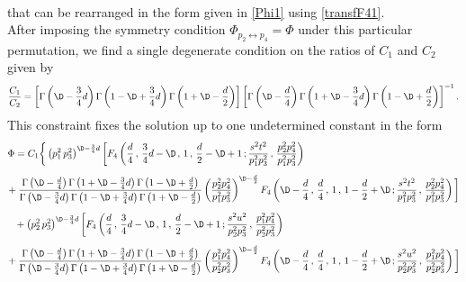 \documentclass[a4paper,11pt,openright,twoside]{book}
\numberwithin{equation}{section}
\begin{document}
{\begin{align}
\end{align}
that can be rearranged in the form given in \eqref{Phi1} using \eqref{transfF41}.\\
After imposing the symmetry condition $\Phi_{p_2\leftrightarrow p_4}=\Phi$ under this particular permutation, we find a single degenerate condition on the ratios of $C_1$ and $C_2$ given by
\begin{equation}
	\frac{C_1}{C_2}=\left[\Gamma\left(\D-\frac{3}{4}d\right)\Gamma\left(1-\D+\frac{3}{4}d\right)\Gamma\left(1+\D-\frac{d}{2}\right)\right]\left[\Gamma\left(\D-\frac{d}{4}\right)\Gamma\left(1+\D-\frac{3}{4}d\right)\Gamma\left(1-\D+\frac{d}{2}\right)\right]^{-1}.
\end{equation}
This constraint fixes the solution up to one undetermined constant in the form
\begin{equation*}
	\begin{aligned}
		\Phi&=C_1\bigg\{\left(p_1^2\,p_3^2\right)^{\D-\frac{3}{4}d}\bigg[F_4\left(\frac{d}{4}\,,\,\frac{3}{4}d-\D\,,\,1\,,\,\frac{d}{2}-\D+1\,;\frac{s^2t^2}{p_1^2p_3^2}\,,\,\frac{p_2^2p_4^2}{p_1^2p_3^2}\right)\\[1.2ex]
		&\hspace{-0.3cm}+\frac{\Gamma\left(\D-\frac{d}{4}\right)\Gamma\left(1+\D-\frac{3}{4}d\right)\Gamma\left(1-\D+\frac{d}{2}\right)}{\Gamma\left(\D-\frac{3}{4}d\right)\Gamma\left(1-\D+\frac{3}{4}d\right)\Gamma\left(1+\D-\frac{d}{2}\right)}\left(\frac{p_2^2p_4^2}{p_1^2p_3^2}\right)^{\D-\frac{d}{2}} F_4\left(\D-\frac{d}{4}\,,\,\frac{d}{4}\, ,\,1\,,\,1-\frac{d}{2}+\D\,;\frac{s^2t^2}{p_1^2p_3^2}\,,\,\frac{p_2^2p_4^2}{p_1^2p_3^2}\right)\bigg]\notag\\[1.2ex]
		&+\left(p_2^2\,p_3^2\right)^{\D-\frac{3}{4}d}\bigg[F_4\left(\frac{d}{4}\,,\,\frac{3}{4}d-\D\, ,\,1\,,\,\frac{d}{2}-\D+1\,;\frac{s^2u^2}{p_2^2p_3^2}\,,\,\frac{p_1^2p_4^2}{p_2^2p_3^2}\right)\\[1.2ex]
		&\hspace{-0.3cm}+\frac{\Gamma\left(\D-\frac{d}{4}\right)\Gamma\left(1+\D-\frac{3}{4}d\right)\Gamma\left(1-\D+\frac{d}{2}\right)}{\Gamma\left(\D-\frac{3}{4}d\right)\Gamma\left(1-\D+\frac{3}{4}d\right)\Gamma\left(1+\D-\frac{d}{2}\right)} \left(\frac{p_1^2p_4^2}{p_2^2p_3^2}\right)^{\D-\frac{d}{2}} F_4\left(\D-\frac{d}{4}\,,\,\frac{d}{4}\, ,\,1\,,\,1-\frac{d}{2}+\D\,;\frac{s^2u^2}{p_2^2p_3^2}\,,\,\frac{p_1^2p_4^2}{p_2^2p_3^2}\right)\bigg]\\[1.2ex]
	\end{aligned}
\end{equation*}
}
\end{document}
